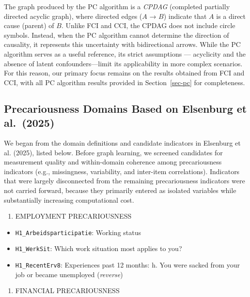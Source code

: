 \documentclass[
]{article}
\providecommand{\tightlist}{%
  \setlength{\itemsep}{0pt}\setlength{\parskip}{0pt}}\usepackage{longtable,booktabs,array}
\begin{document}
The graph produced by the PC algorithm is a \emph{CPDAG} (completed
partially directed acyclic graph), where directed edges (\(A\) → \(B\))
indicate that \(A\) is a direct cause (parent) of \(B\). Unlike FCI and
CCI, the CPDAG does not include circle symbols. Instead, when the PC
algorithm cannot determine the direction of causality, it represents
this uncertainty with bidirectional arrows. While the PC algorithm
serves as a useful reference, its strict assumptions --- acyclicity and
the absence of latent confounders---limit its applicability in more
complex scenarios. For this reason, our primary focus remains on the
results obtained from FCI and CCI, with all PC algorithm results
provided in Section~\ref{sec-pc} for completeness.

\subsection{Precariousness Domains Based on Elsenburg et
al.~(2025)}\label{precariousness-domains-based-on-elsenburg-et-al.-2025}

\textcolor{BrickRed}{We began from the domain definitions and candidate indicators in}
Elsenburg et al. (2025),
\textcolor{BrickRed}{listed below. Before graph learning, we screened candidates for measurement quality and within-domain coherence among precariousness indicators (e.g., missingness, variability, and inter-item correlations). Indicators that were largely disconnected from the remaining precariousness indicators were not carried forward, because they primarily entered as isolated variables while substantially increasing computational cost.}

\begin{enumerate}
\def\labelenumi{\arabic{enumi}.}
\tightlist
\item
  EMPLOYMENT PRECARIOUSNESS
\end{enumerate}

\begin{itemize}
\tightlist
\item
  \texttt{H1\_Arbeidsparticipatie}: Working status
\item
  \texttt{H1\_WerkSit}: Which work situation most applies to you?
\item
  \texttt{H1\_RecentErv8}: Experiences past 12 months: h. You were
  sacked from your job or became unemployed (\emph{reverse})
\end{itemize}

\begin{enumerate}
\def\labelenumi{\arabic{enumi}.}
\setcounter{enumi}{1}
\tightlist
\item
  FINANCIAL PRECARIOUSNESS
\end{enumerate}
\end{document}
